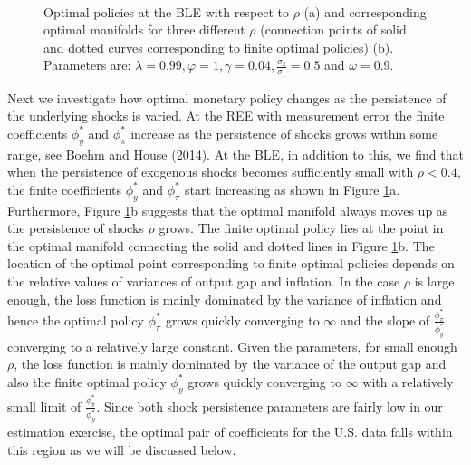     
    \begin{figure}
    \begin{center}
        \mbox{\quad
        }
   \end{center}
   \label{optrho} 
   \caption{ Optimal policies at the BLE with respect to $\rho$ (a) and corresponding optimal manifolds for three different $\rho$ (connection points of solid and dotted curves corresponding to finite optimal policies) (b). Parameters are: $\lambda=0.99, \varphi=1, \gamma=0.04,\frac{\sigma_2}{\sigma_1}=0.5$ and $\omega=0.9$.}
    \end{figure}

Next we investigate how optimal monetary policy changes as the persistence of the underlying shocks is varied. At the REE with measurement error the finite coefficients $\phi_y^*$ and $\phi_\pi^*$ increase as the persistence of shocks grows within some range, see Boehm and House (2014). At the BLE, in addition to this, we find that when the persistence of exogenous shocks becomes sufficiently small with $\rho<0.4$, the finite coefficients $\phi_y^*$ and $\phi_\pi^*$ start increasing as shown in Figure \ref{optrho}a.  Furthermore, Figure \ref{optrho}b suggests that the optimal manifold always moves up as the persistence of shocks $\rho$ grows. The finite optimal policy lies at the point in the optimal manifold connecting the solid and dotted lines in Figure \ref{optrho}b. The location of the optimal point corresponding to finite optimal policies depends on the relative values of variances of output gap and inflation. In the case $\rho$ is large enough, the loss function is mainly dominated by the variance of inflation and hence the optimal policy $\phi_{\pi}^*$ grows quickly converging to $\infty$ and the slope of $\frac{\phi_\pi^*}{\phi_y^*}$ converging to a relatively large constant. Given the parameters, for small enough $\rho$, the loss function is mainly dominated by the variance of the output gap and also the finite optimal policy $\phi_y^*$ grows quickly converging to $\infty$ with a relatively small limit of $\frac{\phi_\pi^*}{\phi_y^*}$. Since both shock persistence parameters are fairly low in our estimation exercise, the optimal pair of coefficients for the U.S. data falls within this region as we will be discussed below. 

